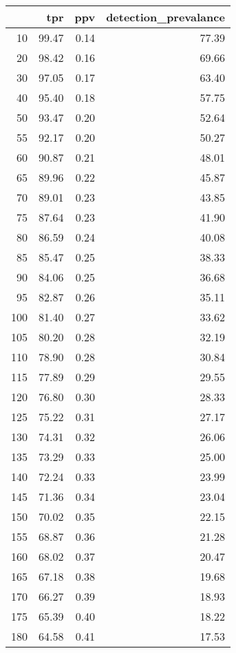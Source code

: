 \begin{table}[ht]
\centering
\begin{tabular}{rrrr}
  \hline
 & tpr & ppv & detection\_prevalance \\ 
  \hline
  10 & 99.47 & 0.14 & 77.39 \\ 
    20 & 98.42 & 0.16 & 69.66 \\ 
    30 & 97.05 & 0.17 & 63.40 \\ 
    40 & 95.40 & 0.18 & 57.75 \\ 
    50 & 93.47 & 0.20 & 52.64 \\ 
    55 & 92.17 & 0.20 & 50.27 \\ 
    60 & 90.87 & 0.21 & 48.01 \\ 
    65 & 89.96 & 0.22 & 45.87 \\ 
    70 & 89.01 & 0.23 & 43.85 \\ 
    75 & 87.64 & 0.23 & 41.90 \\ 
    80 & 86.59 & 0.24 & 40.08 \\ 
    85 & 85.47 & 0.25 & 38.33 \\ 
    90 & 84.06 & 0.25 & 36.68 \\ 
    95 & 82.87 & 0.26 & 35.11 \\ 
   100 & 81.40 & 0.27 & 33.62 \\ 
   105 & 80.20 & 0.28 & 32.19 \\ 
   110 & 78.90 & 0.28 & 30.84 \\ 
   115 & 77.89 & 0.29 & 29.55 \\ 
   120 & 76.80 & 0.30 & 28.33 \\ 
   125 & 75.22 & 0.31 & 27.17 \\ 
   130 & 74.31 & 0.32 & 26.06 \\ 
   135 & 73.29 & 0.33 & 25.00 \\ 
   140 & 72.24 & 0.33 & 23.99 \\ 
   145 & 71.36 & 0.34 & 23.04 \\ 
   150 & 70.02 & 0.35 & 22.15 \\ 
   155 & 68.87 & 0.36 & 21.28 \\ 
   160 & 68.02 & 0.37 & 20.47 \\ 
   165 & 67.18 & 0.38 & 19.68 \\ 
   170 & 66.27 & 0.39 & 18.93 \\ 
   175 & 65.39 & 0.40 & 18.22 \\ 
   180 & 64.58 & 0.41 & 17.53 \\ 

\end{tabular}
\end{table}
